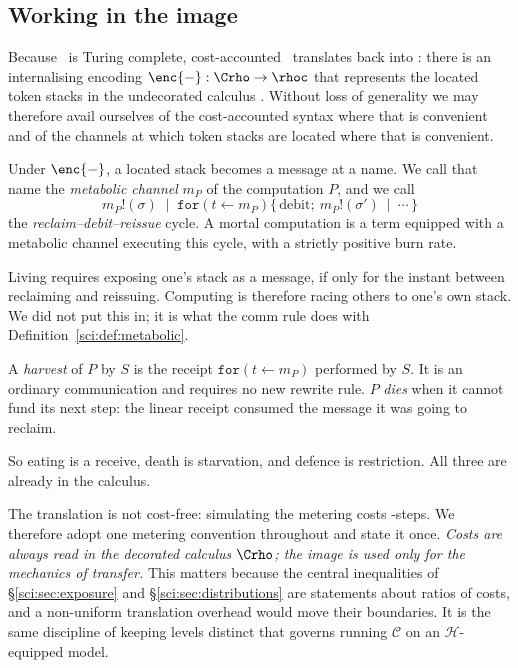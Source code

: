\subsection{Working in the image}\label{sci:S7.2}
\label{sci:sec:image}

Because \rhoc\ is Turing complete, cost-accounted \rhoc\ translates back into \rhoc: there is an
internalising encoding $\enc{-} : \Crho \to \rhoc$ that represents the located token stacks in the
undecorated calculus \cite[\S6]{Omnibus}. Without loss of generality we may therefore avail ourselves
of the cost-accounted syntax where that is convenient and of the channels at which token stacks are
located where that is convenient.

\begin{definition}
\label{sci:def:metabolic}
Under $\enc{-}$, a located stack becomes a message at a name. We call that name the \emph{metabolic
channel} $m_P$ of the computation $P$, and we call
\[
m_P!(\sigma) \;\mid\; \texttt{for}(t \leftarrow m_P)\{\, \text{debit};\ m_P!(\sigma')\ \mid\ \cdots \,\}
\]
the \emph{reclaim--debit--reissue} cycle. A mortal computation is a term equipped with a metabolic
channel executing this cycle, with a strictly positive burn rate.
\end{definition}

\begin{remark}
\label{sci:rem:race}
Living requires exposing one's stack as a message, if only for the instant between reclaiming and
reissuing. Computing is therefore racing others to one's own stack. We did not put this in; it is
what the comm rule does with Definition~\ref{sci:def:metabolic}.
\end{remark}

\begin{definition}
\label{sci:def:harvest}
A \emph{harvest} of $P$ by $S$ is the receipt $\texttt{for}(t \leftarrow m_P)$ performed by $S$. It is
an ordinary communication and requires no new rewrite rule. $P$ \emph{dies} when it cannot fund its
next step: the linear receipt consumed the message it was going to reclaim.
\end{definition}

So eating is a receive, death is starvation, and defence is restriction. All three are already in the
calculus.

\begin{remark}\label{sci:one-ledger}
The translation is not cost-free: simulating the metering costs \rhoc-steps. We therefore adopt one
metering convention throughout and state it once. \emph{Costs are always read in the decorated
calculus $\Crho$; the image is used only for the mechanics of transfer.} This matters because the
central inequalities of \S\ref{sci:sec:exposure} and \S\ref{sci:sec:distributions} are statements about ratios
of costs, and a non-uniform translation overhead would move their boundaries. It is the same
discipline of keeping levels distinct that governs running $\mathcal{C}$ on an
$\mathcal{H}$-equipped model.
\end{remark}

